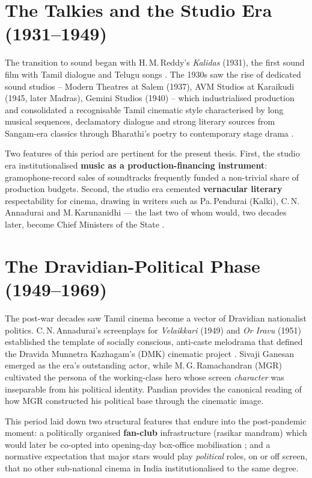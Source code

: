 \section{The Talkies and the Studio Era (1931--1949)}
\label{sec:talkies}

The transition to sound began with H.\,M.\,Reddy's \emph{Kalidas}
(1931), the first sound film with Tamil dialogue and Telugu songs
\citep{baskaran2009}.  The 1930s saw the rise of dedicated sound
studios -- Modern Theatres at Salem (1937), AVM Studios at Karaikudi
(1945, later Madras), Gemini Studios (1940) -- which industrialised
production and consolidated a recognisable Tamil cinematic style
characterised by long musical sequences, declamatory dialogue and
strong literary sources from Sangam-era classics through Bharathi's
poetry to contemporary stage drama \citep{baskaran1996,
ramaswamy1997}.

Two features of this period are pertinent for the present thesis.
First, the studio era institutionalised \textbf{music as a
production-financing instrument}: gramophone-record sales of
soundtracks frequently funded a non-trivial share of production
budgets.  Second, the studio era cemented \textbf{vernacular
literary} respectability for cinema, drawing in writers such as
Pa.\,Pendurai (Kalki), C.\,N.\,Annadurai and M.\,Karunanidhi --- the
last two of whom would, two decades later, become Chief Ministers of
the State \citep{pandian1992,hardgrave1973}.

\section{The Dravidian-Political Phase (1949--1969)}
\label{sec:dravidian}

The post-war decades saw Tamil cinema become a vector of Dravidian
nationalist politics.  C.\,N.\,Annadurai's screenplays for
\emph{Velaikkari} (1949) and \emph{Or Iravu} (1951) established the
template of socially conscious, anti-caste melodrama that defined
the Dravida Munnetra Kazhagam's (DMK) cinematic project
\citep{hardgrave1973,pandian1992}.  Sivaji Ganesan emerged as the
era's outstanding actor, while M.\,G.\,Ramachandran (MGR) cultivated
the persona of the working-class hero whose screen \emph{character}
was inseparable from his political identity.  Pandian
\citeyearpar{pandian1992} provides the canonical reading of how MGR
constructed his political base through the cinematic image.

This period laid down two structural features that endure into the
post-pandemic moment: a politically organised \textbf{fan-club}
infrastructure (rasikar mandram) which would later be co-opted into
opening-day box-office mobilisation \citep{nakassis2017,
pandian1992}; and a normative expectation that major stars would
play \emph{political} roles, on or off screen, that no other
sub-national cinema in India institutionalised to the same degree.

